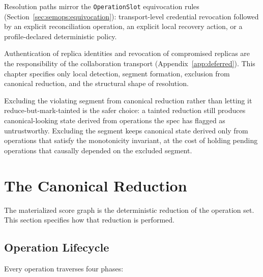 \documentclass[11pt,letterpaper]{report}
\newcounter{requirement}[chapter]
\begin{document}
\begin{requirement}
  Resolution paths mirror the \texttt{OperationSlot} equivocation
  rules (Section~\ref{sec:semops:equivocation}): transport-level
  credential revocation followed by an explicit reconciliation
  operation, an explicit local recovery action, or a
  profile-declared deterministic policy.

  Authentication of replica identities and revocation of
  compromised replicas are the responsibility of the
  collaboration transport (Appendix~\ref{app:deferred}). This
  chapter specifies only local detection, segment formation,
  exclusion from canonical reduction, and the structural shape
  of resolution.
\end{requirement}

\begin{rationale}
  Excluding the violating segment from canonical reduction
  rather than letting it reduce-but-mark-tainted is the safer
  choice: a tainted reduction still produces canonical-looking
  state derived from operations the spec has flagged as
  untrustworthy. Excluding the segment keeps canonical state
  derived only from operations that satisfy the monotonicity
  invariant, at the cost of holding pending operations that
  causally depended on the excluded segment.
\end{rationale}

\section{The Canonical Reduction}
\label{sec:semops:reduction}

The materialized score graph is the deterministic reduction of the
operation set. This section specifies how that reduction is performed.

\subsection{Operation Lifecycle}
\label{sec:semops:lifecycle}

Every operation traverses four phases:
\end{document}
